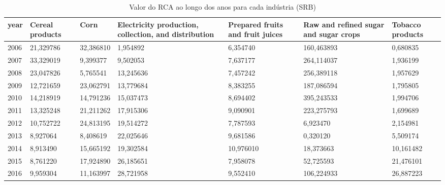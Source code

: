 \begin{table}
\centering
\caption{Valor do RCA ao longo dos anos para cada indústria (SRB)}
\begin{tabular}{p{1cm}p{2cm}p{2cm}p{2cm}p{2cm}p{2cm}p{2cm}}
\toprule
 year &  Cereal products &      Corn &  Electricity production, collection, and distribution &  Prepared fruits and fruit juices &  Raw and refined sugar and sugar crops &  Tobacco products \\
\midrule
 2006 &        21,329786 & 32,386810 &                                           1,954892 &                          6,354740 &                             160,463893 &          0,680835 \\
 2007 &        33,329019 &  9,399377 &                                           9,502053 &                          7,637177 &                             264,114037 &          1,936199 \\
 2008 &        23,047826 &  5,765541 &                                          13,245636 &                          7,457242 &                             256,389118 &          1,957629 \\
 2009 &        12,721659 & 23,062791 &                                          13,779684 &                          8,383255 &                             187,086594 &          1,795805 \\
 2010 &        14,218919 & 14,791236 &                                          15,037473 &                          8,694402 &                             395,243533 &          1,994706 \\
 2011 &        13,325248 & 21,211262 &                                          17,915306 &                          9,090901 &                             223,275793 &          1,699689 \\
 2012 &        10,752722 & 24,813195 &                                          19,514272 &                          7,787593 &                               6,923470 &          2,154981 \\
 2013 &         8,927064 &  8,408619 &                                          22,025646 &                          9,681586 &                               0,320120 &          5,509174 \\
 2014 &         8,913490 & 15,665192 &                                          19,302584 &                         10,976010 &                              18,373663 &         10,161482 \\
 2015 &         8,761220 & 17,924890 &                                          26,185651 &                          7,958078 &                              52,725593 &         21,476101 \\
 2016 &         9,959304 & 11,163997 &                                          28,721958 &                          9,552410 &                             106,224933 &         26,887223 \\
\bottomrule
\end{tabular}
\end{table}
